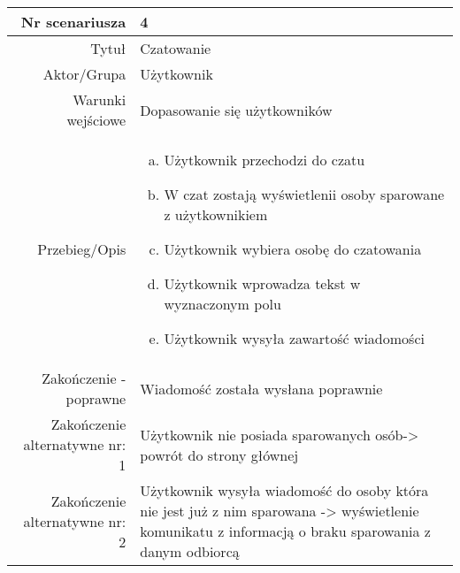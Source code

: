 \documentclass[12pt,a4paper]{article}
\begin{document}
\begin{tabular}{|r|l|} \hline
Nr scenariusza & 4 \\
\hline
Tytuł & Czatowanie \\
\hline
Aktor/Grupa & Użytkownik \\
\hline
Warunki wejściowe & Dopasowanie się użytkowników \\
\hline
Przebieg/Opis & 
\begin{enumerate}[a)]
\item Użytkownik przechodzi do czatu
\item W czat zostają wyświetlenii osoby sparowane z użytkownikiem
\item Użytkownik wybiera  osobę do czatowania
\item Użytkownik wprowadza tekst w wyznaczonym polu
\item Użytkownik wysyła zawartość wiadomości
\end{enumerate}
\\
\hline
Zakończenie - poprawne & Wiadomość została wysłana poprawnie
\\ 
\hline
Zakończenie alternatywne nr: 1 & Użytkownik nie posiada sparowanych osób-> powrót do strony głównej
\\
\hline
Zakończenie alternatywne nr: 2 & Użytkownik wysyła wiadomość do osoby która nie jest już z nim sparowana -> wyświetlenie komunikatu z informacją o braku sparowania z danym odbiorcą
\\
\hline
\end{tabular}
\end{document}
